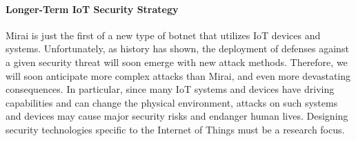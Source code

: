 \documentclass[conference]{IEEEtran}
\begin{document}
\paragraph{\textbf{ Longer-Term IoT Security Strategy}}
Mirai is just the first of a new type of botnet that utilizes IoT devices and systems. Unfortunately, as history has shown, the deployment of defenses against a given security threat will soon emerge with new attack methods. Therefore, we will soon anticipate more complex attacks than Mirai, and even more devastating consequences. In particular, since many IoT systems and devices have driving capabilities and can change the physical environment, attacks on such systems and devices may cause major security risks and endanger human lives. Designing security technologies specific to the Internet of Things must be a research focus.\\
\end{document}
